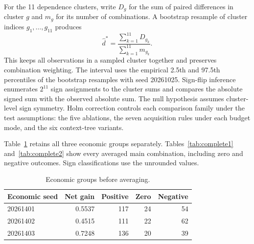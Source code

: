 \documentclass[journal]{IEEEtran}
\newcommand{\smalltable}{\footnotesize\setlength{\tabcolsep}{3.5pt}}
\begin{document}
For the 11 dependence clusters, write $D_g$ for the sum of paired differences in cluster $g$ and $m_g$ for its number of combinations. A bootstrap resample of cluster indices $g_1,\ldots,g_{11}$ produces
\begin{equation}
 \widehat d^*=\frac{\sum_{k=1}^{11}D_{g_k}}{\sum_{k=1}^{11}m_{g_k}}.
\end{equation}
This keeps all observations in a sampled cluster together and preserves combination weighting. The interval uses the empirical 2.5th and 97.5th percentiles of the bootstrap resamples with seed 20261025. Sign-flip inference enumerates $2^{11}$ sign assignments to the cluster sums and compares the absolute signed sum with the observed absolute sum. The null hypothesis assumes cluster-level sign symmetry. Holm correction controls each comparison family under the test assumptions: the five ablations, the seven acquisition rules under each budget mode, and the six context-tree variants.

Table~\ref{tab:seeds} retains all three economic groups separately. Tables~\ref{tab:complete1} and~\ref{tab:complete2} show every averaged main combination, including zero and negative outcomes. Sign classifications use the unrounded values.

\begin{table}[t]
\caption{Economic groups before averaging. }
\label{tab:seeds}\centering\smalltable
\begin{tabular}{lrrrr}
\toprule
Economic seed & Net gain & Positive & Zero & Negative \\
\midrule
20261401 & 0.5537 & 117 & 24 & 54 \\
20261402 & 0.4515 & 111 & 22 & 62 \\
20261403 & 0.7248 & 136 & 20 & 39 \\
\bottomrule
\end{tabular}

\end{table}
\end{document}
